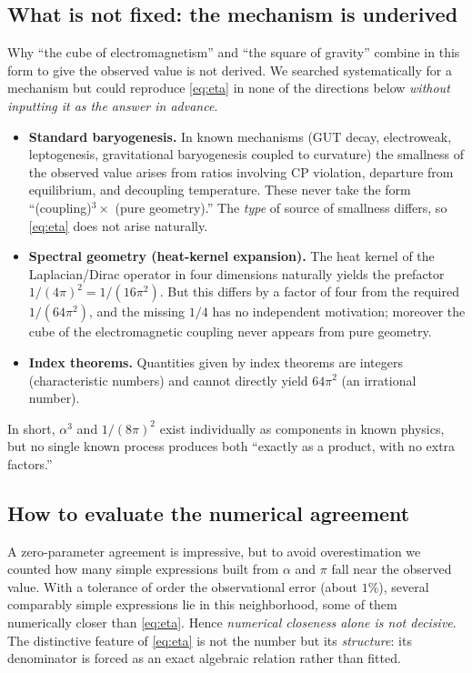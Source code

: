 \documentclass[11pt,a4paper]{article}
\begin{document}
\subsection{What is not fixed: the mechanism is underived}
Why ``the cube of electromagnetism'' and ``the square of gravity'' combine in this form to give the observed value is not derived. We searched systematically for a mechanism but could reproduce \eqref{eq:eta} in none of the directions below \emph{without inputting it as the answer in advance}.
\begin{itemize}[leftmargin=1.4em]
\item \textbf{Standard baryogenesis.} In known mechanisms (GUT decay, electroweak, leptogenesis, gravitational baryogenesis coupled to curvature) the smallness of the observed value arises from ratios involving CP violation, departure from equilibrium, and decoupling temperature. These never take the form ``(coupling)$^3 \times$ (pure geometry).'' The \emph{type} of source of smallness differs, so \eqref{eq:eta} does not arise naturally.
\item \textbf{Spectral geometry (heat-kernel expansion).} The heat kernel of the Laplacian/Dirac operator in four dimensions naturally yields the prefactor $1/(4\pi)^2 = 1/(16\pi^2)$. But this differs by a factor of four from the required $1/(64\pi^2)$, and the missing $1/4$ has no independent motivation; moreover the cube of the electromagnetic coupling never appears from pure geometry.
\item \textbf{Index theorems.} Quantities given by index theorems are integers (characteristic numbers) and cannot directly yield $64\pi^2$ (an irrational number).
\end{itemize}
In short, $\alpha^3$ and $1/(8\pi)^2$ exist individually as components in known physics, but no single known process produces both ``exactly as a product, with no extra factors.''

\subsection{How to evaluate the numerical agreement}
A zero-parameter agreement is impressive, but to avoid overestimation we counted how many simple expressions built from $\alpha$ and $\pi$ fall near the observed value. With a tolerance of order the observational error (about $1\%$), several comparably simple expressions lie in this neighborhood, some of them numerically closer than \eqref{eq:eta}. Hence \emph{numerical closeness alone is not decisive}. The distinctive feature of \eqref{eq:eta} is not the number but its \emph{structure}: its denominator is forced as an exact algebraic relation rather than fitted.
\end{document}
